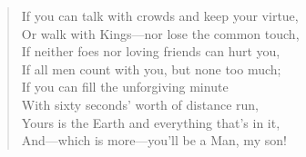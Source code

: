 \documentclass[10pt,a5paper,oneside]{book}
\begin{document}
\begin{verse}
If you can talk with crowds and keep your virtue,\\
\hspace{1em}Or walk with Kings---nor lose the common touch,\\
If neither foes nor loving friends can hurt you,\\
\hspace{1em}If all men count with you, but none too much;\\
If you can fill the unforgiving minute\\
\hspace{1em}With sixty seconds' worth of distance run,\\
Yours is the Earth and everything that's in it,\\
\hspace{1em}And---which is more---you'll be a Man, my son!
\end{verse}
\end{document}
